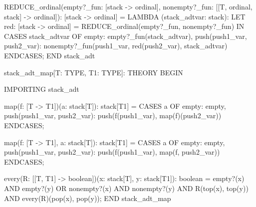   REDUCE_ordinal(empty?_fun: [stack -> ordinal],
                 nonempty?_fun: [[T, ordinal, stack] -> ordinal]):
   [stack -> ordinal] =
      LAMBDA (stack_adtvar: stack):
        LET red: [stack -> ordinal] = REDUCE_ordinal(empty?_fun, nonempty?_fun)
          IN
          CASES stack_adtvar
            OF empty: empty?_fun(stack_adtvar),
               push(push1_var, push2_var):
                 nonempty?_fun(push1_var, red(push2_var), stack_adtvar)
            ENDCASES;
 END stack_adt

stack_adt_map[T: TYPE, T1: TYPE]: THEORY
 BEGIN

  IMPORTING stack_adt

  map(f: [T -> T1])(a: stack[T]):  stack[T1] =
      CASES a
        OF empty: empty,
           push(push1_var, push2_var): push(f(push1_var), map(f)(push2_var))
        ENDCASES;

  map(f: [T -> T1], a: stack[T]):  stack[T1] =
      CASES a
        OF empty: empty,
           push(push1_var, push2_var): push(f(push1_var), map(f, push2_var))
        ENDCASES;

  every(R: [[T, T1] -> boolean])(x: stack[T], y: stack[T1]):  boolean =
      empty?(x) AND empty?(y) OR
       nonempty?(x) AND
        nonempty?(y) AND R(top(x), top(y)) AND every(R)(pop(x), pop(y));
 END stack_adt_map
